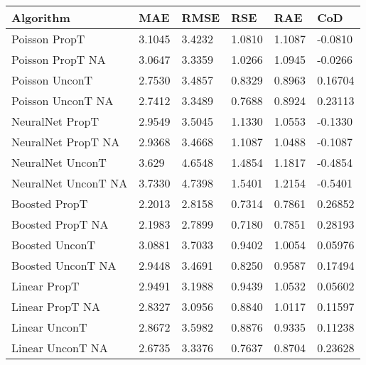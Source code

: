 \begin{table}[htb]
    \begin{tabularx}{\textwidth}{|Y|L{0.08\textwidth}|L{0.10\textwidth}|L{0.08\textwidth}|L{0.08\textwidth}|L{0.12\textwidth}|}
        \hline
        \textbf{Algorithm} &
        \textbf{MAE} &
        \textbf{RMSE} &
        \textbf{RSE} &
        \textbf{RAE} &
        \textbf{CoD} \\ \hline
        Poisson PropT				& 3.1045				& 3.4232				& 1.0810				& 1.1087				& -0.0810  \\
        Poisson PropT NA 			& 3.0647			 	& 3.3359				& 1.0266			 	& 1.0945				& -0.0266  \\
        \hline
        Poisson UnconT				& 2.7530				& 3.4857			 	& 0.8329				& 0.8963			 	& 0.16704  \\
        Poisson UnconT NA 			& 2.7412				& 3.3489			 	& 0.7688				& 0.8924			 	& 0.23113  \\
        \hline
        NeuralNet PropT				& 2.9549				& 3.5045				& 1.1330				& 1.0553				& -0.1330  \\
        NeuralNet PropT NA			& 2.9368				& 3.4668				& 1.1087				& 1.0488				& -0.1087  \\
        \hline
        NeuralNet UnconT			& 3.629					& 4.6548			 	& 1.4854				& 1.1817			 	& -0.4854  \\
        NeuralNet UnconT NA 		& 3.7330				& 4.7398			 	& 1.5401				& 1.2154			 	& -0.5401  \\
        \hline
        Boosted PropT				& 2.2013				& 2.8158			 	& 0.7314				& 0.7861				& 0.26852  \\
        Boosted PropT NA			& 2.1983				& 2.7899				& 0.7180				& 0.7851				& 0.28193  \\
        \hline
        Boosted UnconT				& 3.0881				& 3.7033			 	& 0.9402				& 1.0054			 	& 0.05976  \\
        Boosted UnconT NA 			& 2.9448				& 3.4691			 	& 0.8250				& 0.9587			 	& 0.17494  \\
        \hline
        Linear PropT				& 2.9491				& 3.1988				& 0.9439				& 1.0532				& 0.05602  \\
        Linear PropT NA				& 2.8327			 	& 3.0956				& 0.8840			 	& 1.0117			 	& 0.11597  \\
        \hline
        Linear UnconT				& 2.8672				& 3.5982			 	& 0.8876				& 0.9335			 	& 0.11238  \\
        Linear UnconT NA 			& 2.6735				& 3.3376			 	& 0.7637				& 0.8704			 	& 0.23628  \\

\end{tabularx}
\end{table}
